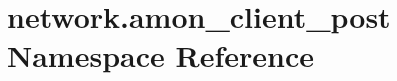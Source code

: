 \hypertarget{namespacenetwork_1_1amon__client__post}{\section{network.\-amon\-\_\-client\-\_\-post Namespace Reference}
\label{namespacenetwork_1_1amon__client__post}
}

